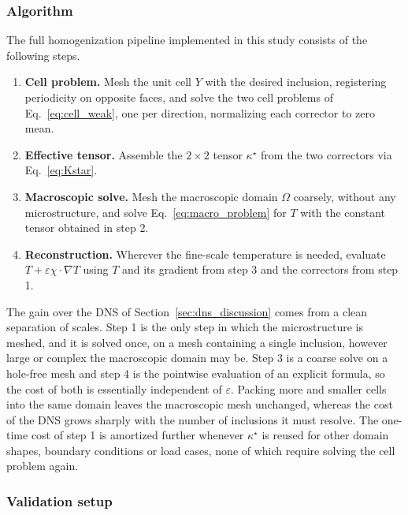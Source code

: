 \documentclass{article}
\makeatletter
\providecommand\FloatBarrier{\par\begingroup\let\@elt\relax
  \edef\@tempa{\@botlist\@deferlist\@dbldeferlist}%
  \ifx\@tempa\@empty\else\clearpage\fi\endgroup}
\newenvironment{enumeratenumeric}{\begin{enumerate}[1.] }{\end{enumerate}}
\makeatother
\begin{document}
\FloatBarrier
\subsubsection{Algorithm}
\label{sec:algorithm}

The full homogenization pipeline implemented in this study consists of the
following steps.
\begin{enumeratenumeric}
  \item \textbf{Cell problem.} Mesh the unit cell $Y$ with the desired
  inclusion, registering periodicity on opposite faces, and solve the two cell
  problems of Eq.~\eqref{eq:cell_weak}, one per direction, normalizing each
  corrector to zero mean.
  
  \item \textbf{Effective tensor.} Assemble the $2 \times 2$ tensor
  $\kappa^{\star}$ from the two correctors via Eq.~\eqref{eq:Kstar}.
  
  \item \textbf{Macroscopic solve.} Mesh the macroscopic domain $\Omega$ coarsely,
  without any microstructure, and solve Eq.~\eqref{eq:macro_problem} for $T$
  with the constant tensor obtained in step 2.
  
  \item \textbf{Reconstruction.} Wherever the fine-scale temperature is needed,
  evaluate $T + \varepsilon \chi \cdot \nabla T$ using $T$ and its gradient from
  step 3 and the correctors from step 1.
\end{enumeratenumeric}
The gain over the DNS of Section~\ref{sec:dns_discussion} comes from a clean
separation of scales. Step 1 is the only step in which the microstructure is
meshed, and it is solved once, on a mesh containing a single inclusion,
however large or complex the macroscopic domain may be. Step 3 is a coarse
solve on a hole-free mesh and step 4 is the pointwise evaluation of an explicit
formula, so the cost of both is essentially independent of $\varepsilon$. Packing
more and smaller cells into the same domain leaves the macroscopic mesh
unchanged, whereas the cost of the DNS grows sharply with the number of
inclusions it must resolve. The one-time cost of step 1 is amortized further
whenever $\kappa^{\star}$ is reused for other domain shapes, boundary conditions
or load cases, none of which require solving the cell problem again.

\FloatBarrier
\subsubsection{Validation setup}
\label{sec:setup}
\end{document}
